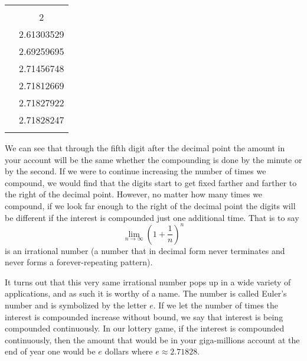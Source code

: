 \begin{margintable}
	\centering
	\caption{}
	\begin{tabular}{S[table-format=8.0]S[table-format=1.8]}
		\beforeheading
		 &  \\             & 2                                             \\            & 2.61303529                                    \\            & 2.69259695                                    \\           & 2.71456748                                    \\          & 2.71812669                                    \\        & 2.71827922                                    \\      & 2.71828247                                    \\\lastline
	\end{tabular}
	\label{exp:tab:wheelfortune}
\end{margintable}
			
We can see that through the fifth digit after the decimal point the 
amount in your account will be the same whether the compounding is 
done by the minute or by the second.  If we were to continue increasing 
the number of times we compound, we would find that the digits start to 
get fixed farther and farther to the right of the decimal point.  
However, no matter how many times we compound, if we look far enough to 
the right of the decimal point the digits will be different if 
the interest is compounded just one additional time. 
That is to say
\[
	\lim_{n\to\infty}\left( 1+\frac{1}{n} \right)^{n}
\]
is an irrational number (a number that in decimal form never terminates 
and never forms a forever-repeating pattern).  
			
It turns out that this very same irrational number pops up in a wide 
variety of applications, and as such it is worthy of a name.  The 
number is called Euler's number and is symbolized by the letter $e$.  
If we let the number of times the interest is compounded increase without 
bound, we say that interest is being compounded continuously.  In our 
lottery game, if the interest is compounded continuously, then the amount 
that would be in your giga-millions account at the end of year one 
would be $e$ dollars where $e\approx 2.71828$.
			
